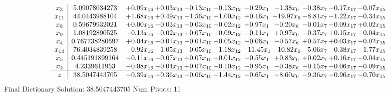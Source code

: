 \documentclass[9pt]{article}
\begin{document}
 \[\begin{array}{c| c c@{\hskip 2pt} c@{\hskip 2pt} c@{\hskip 2pt} c@{\hskip 2pt} c@{\hskip 2pt} c@{\hskip 2pt} c@{\hskip 2pt} c@{\hskip 2pt} c@{\hskip 2pt} }
 x_{3}   &  5.09078034273 & +  0.09 x_{16} & +  0.03 x_{13} & -0.13 x_{10} & -0.13 x_{12} & -0.29 x_{1} & -1.38 x_{6} & -0.38 x_{7} & -0.17 x_{17} & -0.07 x_{15}\\
 x_{11}   &  44.0443988104 & +  1.68 x_{16} & +  0.49 x_{13} & -1.56 x_{10} & -1.00 x_{12} & +  0.16 x_{1} & -19.97 x_{6} & -8.81 x_{7} & -1.22 x_{17} & -0.34 x_{15}\\
 x_{8}   &  0.59679932021 & +  0.00 x_{16} & -0.03 x_{13} & -0.03 x_{10} & -0.02 x_{12} & +  0.97 x_{1} & -0.20 x_{6} & -0.01 x_{7} & -0.09 x_{17} & +  0.02 x_{15}\\
 x_{9}   &  1.08192890525 & -0.13 x_{16} & -0.02 x_{13} & +  0.07 x_{10} & +  0.09 x_{12} & -0.11 x_{1} & +  0.97 x_{6} & -0.37 x_{7} & +  0.15 x_{17} & -0.04 x_{15}\\
 x_{4}   &  0.767738280697 & +  0.04 x_{16} & -0.01 x_{13} & -0.01 x_{10} & +  0.05 x_{12} & -0.06 x_{1} & -0.57 x_{6} & +  0.57 x_{7} & +  0.03 x_{17} & -0.02 x_{15}\\
 x_{14}   &  76.4034839258 & -0.92 x_{16} & -1.05 x_{13} & -0.05 x_{10} & -1.18 x_{12} & -11.45 x_{1} & -10.82 x_{6} & -5.06 x_{7} & -0.38 x_{17} & -1.77 x_{15}\\
 x_{5}   &  0.445191899164 & -0.11 x_{16} & -0.07 x_{13} & +  0.07 x_{10} & +  0.01 x_{12} & -0.55 x_{1} & +  0.83 x_{6} & +  0.02 x_{7} & +  0.16 x_{17} & -0.04 x_{15}\\
 x_{2}   &  4.2339611953 & -0.08 x_{16} & -0.04 x_{13} & +  0.07 x_{10} & -0.10 x_{12} & -0.95 x_{1} & -0.38 x_{6} & -0.15 x_{7} & -0.06 x_{17} & -0.09 x_{15}\\
\hline
z    &  38.5047443705 & -0.39 x_{16} & -0.36 x_{13} & -0.06 x_{10} & -1.44 x_{12} & -0.65 x_{1} & -8.60 x_{6} & -9.36 x_{7} & -0.96 x_{17} & -0.70 x_{15}\\
\end{array}\]
Final Dictionary
Solution:  38.5047443705
Num Pivots:  11
\end{document}

